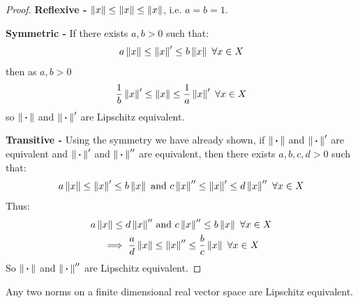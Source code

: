 \documentclass[../main.tex]{subfiles}
\begin{document}
\begin{proof}\par
  \textbf{Reflexive -} $\norm{x} \leq \norm{x} \leq \norm{x}$, i.e. $a = b = 1$.

  \textbf{Symmetric -} If there exists $a, b > 0$ such that:
  \[
    a \norm{x} \leq \norm{x}' \leq b \norm{x}\ \forall x \in X
  \]
  then as $a, b > 0$
  \[
    \frac{1}{b} \norm{x}' \leq \norm{x} \leq \frac{1}{a} \norm{x}'\ \forall x \in X
  \]
  so $\norm{\argdot}$ and $\norm{\argdot}'$ are Lipschitz equivalent.

  \textbf{Transitive -} Using the symmetry we have already shown, if $\norm{\argdot}$ and $\norm{\argdot}'$ are equivalent and $\norm{\argdot}'$ and $\norm{\argdot}''$ are equivalent, then there exists $a, b, c, d > 0$ such that:
  \[
    a \norm{x} \leq \norm{x}' \leq b \norm{x} \text{ and } c \norm{x}'' \leq \norm{x}' \leq d \norm{x}''\ \forall x \in X
  \]
  Thus:
  \begin{align*}
    a \norm{x} \leq d \norm{x}'' &\text{ and } c \norm{x}'' \leq b \norm{x}\ \forall x \in X \\
    \implies \frac{a}{d} \norm{x} &\leq \norm{x}'' \leq \frac{b}{c} \norm{x}\ \forall x \in X
  \end{align*}
  So $\norm{\argdot}$ and $\norm{\argdot}''$ are Lipschitz equivalent.
\end{proof}
\begin{theorem}
  Any two norms on a finite dimensional real vector space are Lipschitz equivalent. \label{lEquiv}
\end{theorem}
\end{document}
